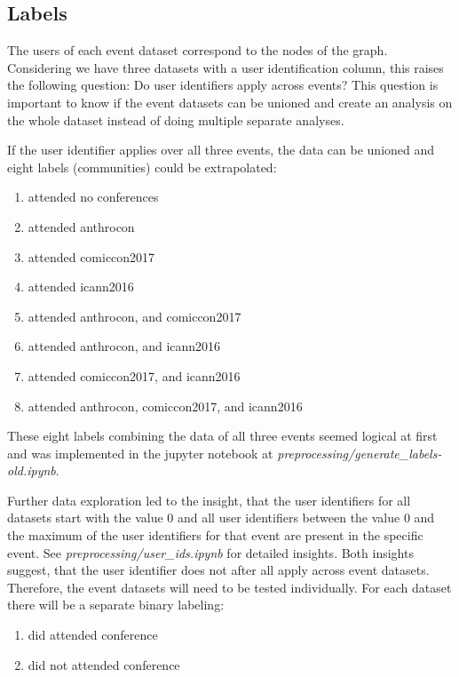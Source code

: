 \documentclass[sigconf]{acmart}
\begin{document}
\subsection{Labels}

The users of each event dataset correspond to the nodes of the graph. Considering we have three datasets with a user identification column, this raises the following question: Do user identifiers apply across events? This question is important to know if the event datasets can be unioned and create an analysis on the whole dataset instead of doing multiple separate analyses.

If the user identifier applies over all three events, the data can be unioned and eight labels (communities) could be extrapolated:

\begin{enumerate}
	\item attended no conferences
	\item attended anthrocon
	\item attended comiccon2017
	\item attended icann2016
	\item attended anthrocon, and comiccon2017
	\item attended anthrocon, and icann2016
	\item attended comiccon2017, and icann2016
	\item attended anthrocon, comiccon2017, and icann2016
\end{enumerate}

These eight labels combining the data of all three events seemed logical at first and was implemented in the jupyter notebook at \textit{preprocessing/generate\_labels-old.ipynb}.

Further data exploration led to the insight, that the user identifiers for all datasets start with the value $0$ and all user identifiers between the value $0$ and the maximum of the user identifiers for that event are present in the specific event. See \textit{preprocessing/user\_ids.ipynb} for detailed insights. Both insights suggest, that the user identifier does not after all apply across event datasets. Therefore, the event datasets will need to be tested individually. For each dataset there will be a separate binary labeling:

\begin{enumerate}
	\item did attended conference
	\item did not attended conference
\end{enumerate}
\end{document}
